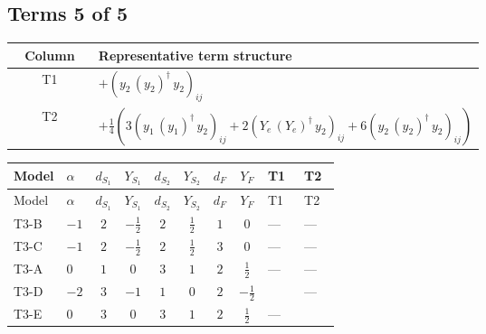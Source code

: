 \documentclass[8pt]{article}
\begin{document}
\begin{landscape}
\subsection*{Terms 5 of 5}
\begin{center}
\begin{tabular}{@{}c >{\raggedright\arraybackslash}p{0.82\linewidth}@{}}
\toprule
Column & Representative term structure \\
\midrule
T1 & \(\displaystyle +\left({y_2}\,\left({y_2}\right)^{\dagger}\,{y_2}\right)_{ij}\) \\
\midrule
T2 & \(\displaystyle +\frac{1}{4} (3 \left({y_1}\,\left({y_1}\right)^{\dagger}\,{y_2}\right)_{ij}+2 \left({Y_e}\,\left({Y_e}\right)^{\dagger}\,{y_2}\right)_{ij}+6 \left({y_2}\,\left({y_2}\right)^{\dagger}\,{y_2}\right)_{ij})\) \\
\midrule
\bottomrule
\end{tabular}
\end{center}
\smallskip
\tiny
\begin{longtable}{@{}llcccccc >{\raggedright\arraybackslash}p{0.21\linewidth} >{\raggedright\arraybackslash}p{0.21\linewidth}@{}}
\toprule
Model & $\alpha$ & $d_{S_1}$ & $Y_{S_1}$ & $d_{S_2}$ & $Y_{S_2}$ & $d_F$ & $Y_F$ & T1 & T2 \\
\midrule
\endfirsthead
\toprule
Model & $\alpha$ & $d_{S_1}$ & $Y_{S_1}$ & $d_{S_2}$ & $Y_{S_2}$ & $d_F$ & $Y_F$ & T1 & T2 \\
\midrule
\endhead
T3-B & $-1$ & $2$ & $-\frac{1}{2}$ & $2$ & $\frac{1}{2}$ & $1$ & $0$ & --- & --- \\
\midrule
T3-C & $-1$ & $2$ & $-\frac{1}{2}$ & $2$ & $\frac{1}{2}$ & $3$ & $0$ & --- & --- \\
\midrule
T3-A & $0$ & $1$ & $0$ & $3$ & $1$ & $2$ & $\frac{1}{2}$ & --- & --- \\
\midrule
T3-D & $-2$ & $3$ & $-1$ & $1$ & $0$ & $2$ & $-\frac{1}{2}$ & \scriptsize\adjustbox{max width=\linewidth}{$\begin{gathered} +\left({y_2}\,\left({y_2}\right)^{\dagger}\,{y_2}\right)_{ij}\end{gathered}$} & --- \\
\midrule
T3-E & $0$ & $3$ & $0$ & $3$ & $1$ & $2$ & $\frac{1}{2}$ & --- & \scriptsize\adjustbox{max width=\linewidth}{$\begin{gathered} +\frac{1}{4} (3 \left({y_1}\,\left({y_1}\right)^{\dagger}\,{y_2}\right)_{ij}+2 \left({Y_e}\,\left({Y_e}\right)^{\dagger}\,{y_2}\right)_{ij}+6 \left({y_2}\,\left({y_2}\right)^{\dagger}\,{y_2}\right)_{ij})\end{gathered}$} \\
\midrule
\bottomrule
\end{longtable}
\clearpage

\end{landscape}
\end{document}
